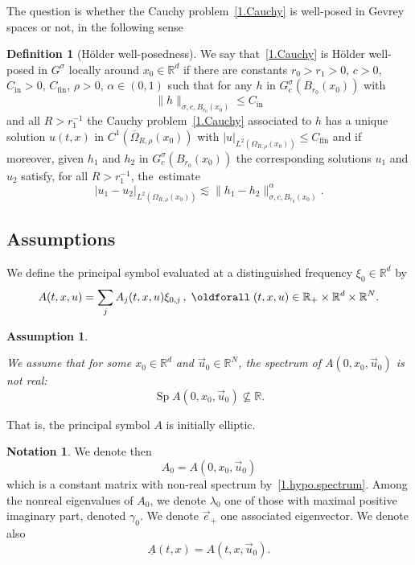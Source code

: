 \documentclass[10pt]{amsart}
\theoremstyle{definition}
\newtheorem{defi}[cdrthm]{Definition}
\newtheorem{notation}[cdrthm]{Notation}
\theoremstyle{plain}
\newtheorem{hypo}[cdrthm]{Assumption} }
\newcommand*\R{{\mathbb R}}
\newcommand{\alf}{\alpha}%
\newcommand*\g{\gamma}
\newcommand*\und{\underline}
\DeclareMathOperator{\Sp}{Sp}
\renewcommand*{\forall}{\mathrel{\oldforall}}
\begin{document}
The question is whether the Cauchy problem~\eqref{1.Cauchy} is well-posed in Gevrey spaces or not, in the following sense

\begin{defi}[H\"older well-posedness]\label{1.defi.well_posedness}
We say that~\eqref{1.Cauchy} is H\"older well-posed in $G^{\sigma}$ locally around $x_0\in\R^{d}$ if there are constants $r_0 > r_1 >0$, $c>0$, $C_{\text{in}}>0$, $C_{\text{fin}}$, $\rho>0$, $\alf\in(0,1)$ such that for any $h$ in $G^{\sigma}_{c}(B_{r_0}(x_0))$ with
\[
\|h\|_{\sigma,c,B_{r_0}(x_0)} \leq C_{\text{in}}
\]
and all $R>r_1^{-1}$ the Cauchy problem~\eqref{1.Cauchy} associated to $h$ has a unique solution $u(t,x)$ in $C^{1}(\overline{\Omega}_{R,\rho}(x_0))$ with $|u|_{L^{2}(\Omega_{R,\rho}(x_0))} \leq C_{\text{fin}}$ and if moreover, given $h_1$ and $h_2$ in $G^{\sigma}_{c}(B_{r_0}(x_0))$ the corresponding solutions $u_1$ and $u_2$ satisfy, for all $R>r_1^{-1}$, the~estimate
\[
|u_1 - u_2|_{L^{2}(\Omega_{R,\rho}(x_0))} \lesssim\|h_1 - h_2\|_{\sigma,c,B_{r_0}(x_0)}^{\alf}.
\]
\end{defi}



\subsection{Assumptions}\label{1.subsection.normal}


We define the principal symbol evaluated at a distinguished frequency $ \xi_0\in\R^{d}$ by
\begin{equation}\label{1.def.A}
A(t,x,u) = \sum_{j} A_j(t,x,u)\xi_{0,j} \,, \; \forall (t,x,u) \in \R_{+}\times\R^{d}\times\R^{N}.
\end{equation}

\begin{hypo}\label{1.hypo.1}

We assume that for some $x_0\in\R^{d}$ and $\vec{u}_0\in\R^{N}$, the spectrum of $A(0,x_0,\vec{u}_0)$ is not real:
\begin{equation}\label{1.hypo.spectrum}
{\Sp} A(0,x_0,\vec{u}_0) \not\subseteq \R.
\end{equation}
\end{hypo}

That is, the principal symbol $A$ is initially elliptic.

\begin{notation}\label{1.notation.elli}
We denote then
\begin{equation}\label{1.def.A_0}
A_0 = A(0,x_0,\vec{u}_0)
\end{equation}
which is a constant matrix with non-real spectrum by~\eqref{1.hypo.spectrum}. Among the nonreal eigenvalues of $A_0$, we denote $\lambda_0$ one of those with maximal positive imaginary part, denoted $\g_0$. We denote $\vec{e}_{+}$ one associated eigenvector. We denote also
\begin{equation}\label{1.def.undA}
\und{A}(t,x) = A(t,x,\vec{u}_0).
\end{equation}
\end{notation}
\end{document}
